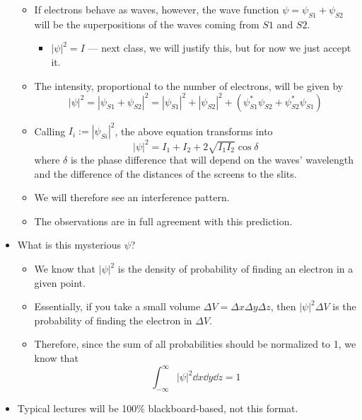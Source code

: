 \documentclass[../notes.tex]{subfiles}
\begin{document}
\begin{itemize}
\begin{itemize}
\begin{itemize}
        \end{itemize}
        \item If electrons behave as waves, however, the wave function $\psi=\psi_{S1}+\psi_{S2}$ will be the superpositions of the waves coming from $S1$ and $S2$.
        \begin{itemize}
            \item $|\psi|^2=I$ --- next class, we will justify this, but for now we just accept it.
        \end{itemize}
        \item The intensity, proportional to the number of electrons, will be given by
        \begin{equation*}
            |\psi|^2 = |\psi_{S1}+\psi_{S2}|^2
            = |\psi_{S1}|^2+|\psi_{S2}|^2+(\psi_{S1}^*\psi_{S2}+\psi_{S2}^*\psi_{S1})
        \end{equation*}
        \item Calling $I_i:=|\psi_{Si}|^2$, the above equation transforms into
        \begin{equation*}
            |\psi|^2 = I_1+I_2+2\sqrt{I_1I_2}\cos\delta
        \end{equation*}
        where $\delta$ is the phase difference that will depend on the waves' wavelength and the difference of the distances of the screens to the slits.
        \item We will therefore see an interference pattern.
        \item The observations are in full agreement with this prediction.
    \end{itemize}
    \item What is this mysterious $\psi$?
    \begin{itemize}
        \item We know that $|\psi|^2$ is the density of probability of finding an electron in a given point.
        \item Essentially, if you take a small volume $\Delta V=\Delta x\Delta y\Delta z$, then $|\psi|^2\Delta V$ is the probability of finding the electron in $\Delta V$.
        \item Therefore, since the sum of all probabilities should be normalized to 1, we know that
        \begin{equation*}
            \int_{-\infty}^\infty|\psi|^2\dd{x}\dd{y}\dd{z} = 1
        \end{equation*}
    \end{itemize}
    \item Typical lectures will be 100\% blackboard-based, not this format.

\end{itemize}
\end{document}
